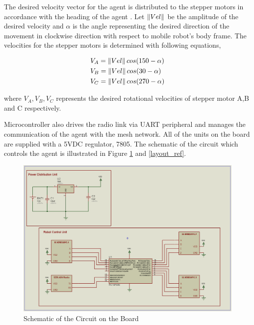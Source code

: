 The desired velocity vector for the agent is  distributed to the stepper motors in accordance with the heading of the agent . Let $\left\lVert Vel\right\rVert$ be the amplitude of the desired velocity and $\alpha$ is the angle representing the desired direction of the movement in clockwise direction with respect to mobile robot's body frame.  The velocities for the stepper motors is determined with following equations,
		
\begin{align*}
& V_A = \left\lVert Vel\right\rVert cos(150-\alpha) \\
& V_B = \left\lVert Vel\right\rVert cos(30 -\alpha) \\
& V_C = \left\lVert Vel\right\rVert cos(270-\alpha) 
\end{align*}  

where $V_A, V_B, V_C$ represents the desired rotational velocities of  stepper motor A,B and C respectively.
		
Microcontroller also drives the radio link via UART peripheral and manages the communication of the agent with the mesh network. All of the units on the board are supplied with a 5VDC regulator, 7805. The schematic of the circuit which controls the agent is illustrated in Figure \ref{sematik_ref} and \ref{layout_ref}.
		
\begin{figure}[H]
\caption{Schematic of the Circuit on the Board} \label{sematik_ref}
\centerline{\includegraphics[scale = 0.40]{sematik}}
\end{figure} 

